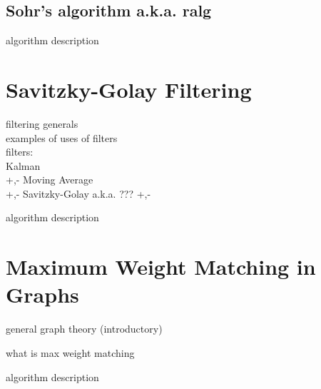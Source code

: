 \subsection{Sohr's algorithm a.k.a. ralg} \label{subsec:theorBack-CONMIN}

algorithm description

\section{Savitzky-Golay Filtering} \label{sec:theorBack-SavitzkyGolay}

filtering generals\\
examples of uses of filters\\
filters:\\
	Kalman\\
		+,-
	Moving Average\\
		+,-
	Savitzky-Golay a.k.a. ???
		+,-

algorithm description

\section{Maximum Weight Matching in Graphs} \label{sec:theorBack-MWMGraphs}

general graph theory (introductory)

what is max weight matching

algorithm description
